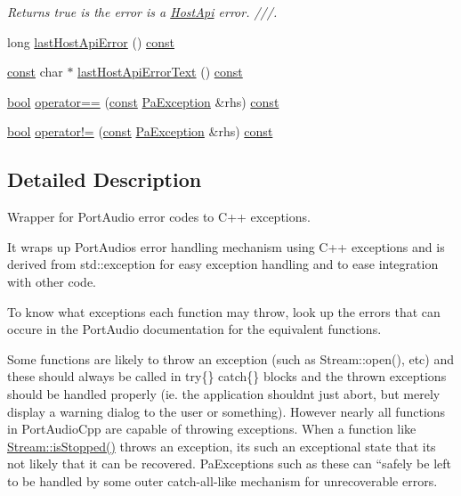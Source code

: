 \begin{DoxyCompactItemize}
\begin{DoxyCompactList}\small\item\em Returns true is the error is a \hyperlink{classportaudio_1_1_host_api}{Host\+Api} error. ///. \end{DoxyCompactList}\item 
long \hyperlink{classportaudio_1_1_pa_exception_a0ac3d71d5b3c25286390af5eeef4efd6}{last\+Host\+Api\+Error} () \hyperlink{getopt1_8c_a2c212835823e3c54a8ab6d95c652660e}{const} 
\item 
\hyperlink{getopt1_8c_a2c212835823e3c54a8ab6d95c652660e}{const} char $\ast$ \hyperlink{classportaudio_1_1_pa_exception_a522aacb863209b01cac7c75ab77baba5}{last\+Host\+Api\+Error\+Text} () \hyperlink{getopt1_8c_a2c212835823e3c54a8ab6d95c652660e}{const} 
\item 
\hyperlink{mac_2config_2i386_2lib-src_2libsoxr_2soxr-config_8h_abb452686968e48b67397da5f97445f5b}{bool} \hyperlink{classportaudio_1_1_pa_exception_af260698024cbd224c58a619da51ceed9}{operator==} (\hyperlink{getopt1_8c_a2c212835823e3c54a8ab6d95c652660e}{const} \hyperlink{classportaudio_1_1_pa_exception}{Pa\+Exception} \&rhs) \hyperlink{getopt1_8c_a2c212835823e3c54a8ab6d95c652660e}{const} 
\item 
\hyperlink{mac_2config_2i386_2lib-src_2libsoxr_2soxr-config_8h_abb452686968e48b67397da5f97445f5b}{bool} \hyperlink{classportaudio_1_1_pa_exception_a55020aa670918f47f087677111fc3f77}{operator!=} (\hyperlink{getopt1_8c_a2c212835823e3c54a8ab6d95c652660e}{const} \hyperlink{classportaudio_1_1_pa_exception}{Pa\+Exception} \&rhs) \hyperlink{getopt1_8c_a2c212835823e3c54a8ab6d95c652660e}{const} 
\end{DoxyCompactItemize}


\subsection{Detailed Description}
Wrapper for Port\+Audio error codes to C++ exceptions. 

It wraps up Port\+Audio\textquotesingle{}s error handling mechanism using C++ exceptions and is derived from std\+::exception for easy exception handling and to ease integration with other code.

To know what exceptions each function may throw, look up the errors that can occure in the Port\+Audio documentation for the equivalent functions.

Some functions are likely to throw an exception (such as Stream\+::open(), etc) and these should always be called in try\{\} catch\{\} blocks and the thrown exceptions should be handled properly (ie. the application shouldn\textquotesingle{}t just abort, but merely display a warning dialog to the user or something). However nearly all functions in Port\+Audio\+Cpp are capable of throwing exceptions. When a function like \hyperlink{classportaudio_1_1_stream_ada2dbfeb07d901c0a5e554706886751b}{Stream\+::is\+Stopped()} throws an exception, it\textquotesingle{}s such an exceptional state that it\textquotesingle{}s not likely that it can be recovered. Pa\+Exceptions such as these can ``safely\textquotesingle{}\textquotesingle{} be left to be handled by some outer catch-\/all-\/like mechanism for unrecoverable errors. 

